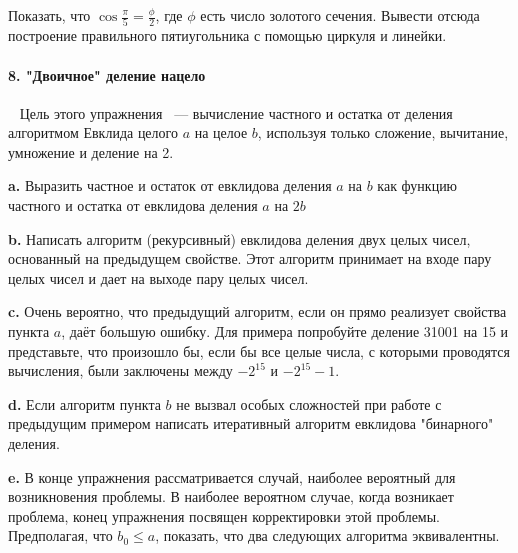 Показать, что $ \cos{\frac{\pi}{5}}=\frac{\phi}{2}$, где $\phi$ есть число золотого сечения. Вывести отсюда построение правильного пятиугольника с помощью циркуля и линейки. 

\paragraph { 8. "Двоичное" деление нацело}\ \newline
Цель этого упражнения ~--- вычисление частного и остатка от деления алгоритмом Евклида целого $a$ на целое $b$, используя только сложение, вычитание, умножение и деление на 2. 

\textbf{ a.} Выразить частное и остаток от евклидова деления $a$ на $b$ как функцию частного и остатка от евклидова деления $a$ на $2b$

\textbf{ b.} Написать алгоритм (рекурсивный) евклидова деления двух целых чисел, основанный на предыдущем свойстве. Этот алгоритм принимает на входе пару целых чисел и дает на выходе пару целых чисел. 

\textbf{ c.} Очень вероятно, что предыдущий алгоритм, если он прямо реализует свойства пункта $a$, даёт большую ошибку. Для примера попробуйте деление 31001 на 15 и представьте, что произошло бы, если бы все целые числа, с которыми проводятся вычисления, были заключены между $-2^{15}$ и $-2^{15}-1$. 

\textbf{ d.} Если алгоритм пункта $b$ не вызвал особых сложностей при работе с предыдущим примером написать итеративный алгоритм евклидова "бинарного" деления. 

\textbf{ e.} В конце упражнения рассматривается случай, наиболее вероятный для возникновения проблемы. В наиболее вероятном случае, когда возникает проблема, конец упражнения посвящен корректировки этой проблемы.  Предполагая, что $b_{0}\leq{a}$, показать, что два следующих алгоритма эквивалентны. 

\newpage
	
\iffalse
\noindent 
\begin{minipage}[t]{50mm}\parindent=2em
 
 
\fbox{$b\leftarrow{b_{0}}$;$k\leftarrow{0}$;\linebreak
While(1) \{\linebreak
$b\leftarrow{2\times{b}}$;$ k\leftarrow{k+1}$;\linebreak
  If(b>a) \{\linebreak
       Break;\}\}}\linebreak
\end{minipage} 
\hfill 
\begin{minipage}[t]{50mm} 
\fbox{$b\leftarrow{b_{0}}$;$k\leftarrow{0}$;\linebreak
While(b<=a/2) \{\linebreak
      While(1)\{\linebreak
$b\leftarrow{2\times{b}}$;$ k\leftarrow{k+1}$;\}\}\linebreak
$b\leftarrow{2\times{b}}$;$ k\leftarrow{k+1}$;}\linebreak
\end{minipage}
\fi


